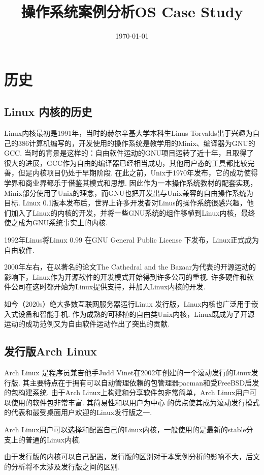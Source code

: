 \documentclass[11pt]{article}
\date{\today}
\title{操作系统案例分析}
\begin{document}
\lstset{
	breaklines=true,
	basicstyle=\ttfamily}
\title{OS Case Study}

\maketitle
\tableofcontents

\newpage

\section{历史}
\subsection{Linux 内核的历史}
Linux内核最初是1991年，当时的赫尔辛基大学本科生Linus Torvalds出于兴趣为自己的386计算机编写的，开发使用的操作系统是教学用的Minix、编译器为GNU的GCC.
当时的背景是这样的：自由软件运动的GNU项目运转了近十年，且取得了很大的进展，GCC作为自由的编译器已经相当成功，其他用户态的工具都比较完善，但是内核项目仍处于早期阶段.
在此之前，Unix于1970年发布，它的成功使得学界和商业界都乐于借鉴其模式和思想.
因此作为一本操作系统教材的配套实现，Minix部分使用了Unix的理念，而GNU也把开发出与Unix兼容的自由操作系统为目标.
Linux 0.1版本发布后，世界上许多开发者对Linus的操作系统很感兴趣，他们加入了Linux的内核的开发，并将一些GNU系统的组件移植到Linux内核，最终使之成为GNU系统事实上的内核.

1992年Linus将Linux 0.99 在GNU General Public License 下发布，Linux正式成为自由软件.

2000年左右，在以著名的论文The Cathedral and the Bazaar为代表的开源运动的影响下，Linux作为开源软件的开发模式开始得到许多公司的重视.
许多硬件和软件公司在这时都开始为Linux提供支持，并加入Linux内核的开发.

如今（2020s）绝大多数互联网服务器运行Linux 发行版\cite{OSUsageT34:online}，Linux内核也广泛用于嵌入式设备和智能手机.
作为成熟的可移植的自由类Unix内核，Linux既成为了开源运动的成功范例又为自由软件运动作出了突出的贡献.
\subsection{发行版Arch Linux}
Arch Linux 是程序员兼吉他手Judd Vinet在2002年创建的一个滚动发行的Linux发行版.
其主要特点在于拥有可以自动管理依赖的包管理器pacman和受FreeBSD启发的包构建系统\cite{DistroWa81:online}.
由于Arch Linux上构建和分享软件包非常简单，Arch Linux用户可以使用的软件包非常丰富.
其简易性和以用户为中心\cite{ArchLinux15:online} 的优点使其成为滚动发行模式的代表和最受桌面用户欢迎的Linux发行版之一.

Arch Linux用户可以选择和配置自己的Linux内核，一般使用的是最新的stable分支上的普通的Linux内核.
\begin{notebox}
	由于发行版的内核可以自己配置，发行版的区别对于本案例分析的影响不大，后文的分析将不太涉及发行版之间的区别.
\end{notebox}





\printbibliography[heading=bibintoc]

\newpage
\end{document}

